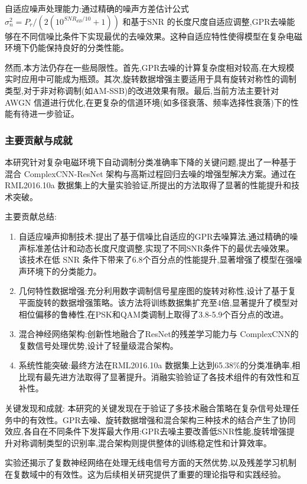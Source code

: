 \documentclass{article}
\begin{document}
\begin{CJK}{UTF8}{gbsn}
自适应噪声处理能力:通过精确的噪声方差估计公式 $\sigma_{n}^{2}=P_{r}/(2(10^{SNR_{dB}/10}+1))$ 和基于SNR 的长度尺度自适应调整,GPR去噪能够在不同信噪比条件下实现最优的去噪效果。这种自适应特性使得模型在复杂电磁环境下仍能保持良好的分类性能。

然而,本方法仍存在一些局限性。首先,GPR去噪的计算复杂度相对较高,在大规模实时应用中可能成为瓶颈。其次,旋转数据增强主要适用于具有旋转对称性的调制类型,对于非对称调制(如AM-SSB)的改进效果有限。最后,当前方法主要针对AWGN 信道进行优化,在更复杂的信道环境(如多径衰落、频率选择性衰落)下的性能有待进一步验证。

\subsubsection{主要贡献与成就}
本研究针对复杂电磁环境下自动调制分类准确率下降的关键问题,提出了一种基于混合 ComplexCNN-ResNet 架构与高斯过程回归去噪的增强型解决方案。通过在RML2016.10a 数据集上的大量实验验证,所提出的方法取得了显著的性能提升和技术突破。

主要贡献总结:
\begin{enumerate}
    \item 自适应噪声抑制技术:提出了基于信噪比自适应的GPR去噪算法,通过精确的噪声标准差估计和动态长度尺度调整,实现了不同SNR条件下的最优去噪效果。该技术在低 SNR 条件下带来了6.8个百分点的性能提升,显著增强了模型在强噪声环境下的分类能力。
    \item 几何特性数据增强:充分利用数字调制信号星座图的旋转对称性,设计了基于复平面旋转的数据增强策略。该方法将训练数据集扩充至4倍,显著提升了模型对相位偏移的鲁棒性,在PSK和QAM类调制上取得了3.8-5.9个百分点的改进。
    \item 混合神经网络架构:创新性地融合了ResNet的残差学习能力与 ComplexCNN的复数信号处理优势,设计了轻量级混合架构。
    \item 系统性能突破:最终方法在RML2016.10a 数据集上达到65.38\%的分类准确率,相比现有最先进方法取得了显著提升。消融实验验证了各技术组件的有效性和互补性。
\end{enumerate}

关键发现和成就:
本研究的关键发现在于验证了多技术融合策略在复杂信号处理任务中的有效性。GPR去噪、旋转数据增强和混合架构三种技术的结合产生了协同效应,各自在不同条件下发挥最大作用:GPR去噪主要改善低SNR性能,旋转增强提升对称调制类型的识别率,混合架构则提供整体的训练稳定性和计算效率。

实验还揭示了复数神经网络在处理无线电信号方面的天然优势,以及残差学习机制在复数域中的有效性。这为后续相关研究提供了重要的理论指导和实践经验。


\end{CJK}
\end{document}
